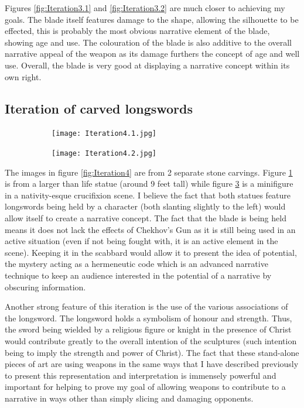 \documentclass{article}
\begin{document}
Figures \ref{fig:Iteration3.1} and \ref{fig:Iteration3.2} are much closer to achieving my goals. The blade itself features damage to the shape, allowing the silhouette to be effected, this is probably the most obvious narrative element of the blade, showing age and use. The colouration of the blade is also additive to the overall narrative appeal of the weapon as its damage furthers the concept of age and well use. Overall, the blade is very good at displaying a narrative concept within its own right.

\pagebreak

\subsection{Iteration of carved longswords} \label{Iteration4}

\begin{figure}[h]
    \centering
    \caption{}
    \label{fig:Iteration4}
    \begin{subfigure}{0.49\textwidth}
        \texttt{[image: Iteration4.1.jpg]}
        \caption{}
        \label{fig:Iteration4.1}
    \end{subfigure}
    \begin{subfigure}{0.49\textwidth}
        \texttt{[image: Iteration4.2.jpg]}
        \caption{}
        \label{fig:Iteration4.2}
    \end{subfigure}
\end{figure}

The images in figure \ref{fig:Iteration4} are from 2 separate stone carvings. Figure \ref{fig:Iteration4.1} is from a larger than life statue (around 9 feet tall) while figure \ref{fig:Iteration4.2} is a minifigure in a nativity-esque crucifixion scene. I believe the fact that both statues feature longswords being held by a character (both slanting slightly to the left) would allow itself to create a narrative concept. The fact that the blade is being held means it does not lack the effects of Chekhov's Gun \parencite{delaney1990chekhov} as it is still being used in an active situation (even if not being fought with, it is an active element in the scene). Keeping it in the scabbard would allow it to present the idea of potential, the mystery acting as a hermeneutic code \parencite{barthes1972semiotics} which is an advanced narrative technique to keep an audience interested in the potential of a narrative by obscuring information.

Another strong feature of this iteration is the use of the various associations of the longsword. The longsword holds a symbolism of honour and strength. Thus, the sword being wielded by a religious figure or knight in the presence of Christ would contribute greatly to the overall intention of the sculptures (such intention being to imply the strength and power of Christ). The fact that these stand-alone pieces of art are using weapons in the same ways that I have described previously to present this representation and interpretation is immensely powerful and important for helping to prove my goal of allowing weapons to contribute to a narrative in ways other than simply slicing and damaging opponents.
\end{document}
